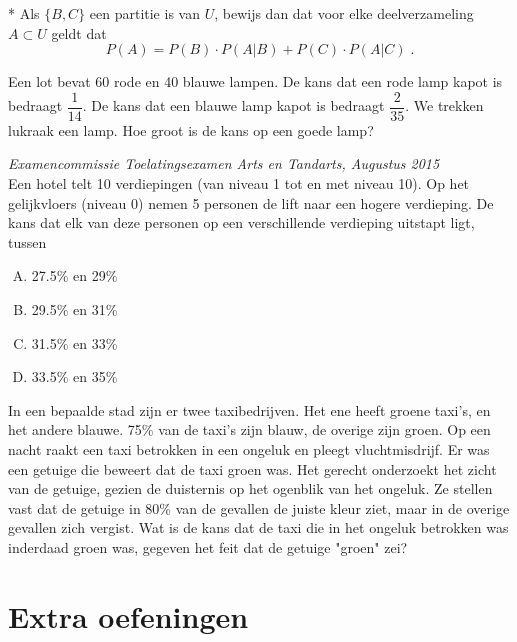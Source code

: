 \documentclass[12pt,twoside]{article}
\begin{document}
\begin{oefening}*
Als $\{B,C\}$ een partitie is van $U$, bewijs dan dat voor elke deelverzameling $A\subset U$ geldt dat
$$P(A)=P(B)\cdot P(A|B)+P(C)\cdot P(A|C)\;.$$
\end{oefening}

\begin{oefening}
Een lot bevat 60 rode en 40 blauwe lampen. De kans dat een rode lamp kapot is bedraagt $\dfrac{1}{14}$. De kans dat een blauwe lamp kapot is bedraagt $\dfrac{2}{35}$. We trekken lukraak een lamp. Hoe groot is de kans op een goede lamp?
\end{oefening}

\begin{oefening}
{\scriptsize\em Examencommissie Toelatingsexamen Arts en Tandarts, Augustus 2015}\\
Een hotel telt 10 verdiepingen (van niveau 1 tot en met niveau 10). Op het gelijkvloers
(niveau 0) nemen 5 personen de lift naar een hogere verdieping. De kans dat elk van deze
personen op een verschillende verdieping uitstapt ligt, tussen
\begin{enumerate}[(A)]
  \item 27.5\% en 29\%
  \item 29.5\% en 31\%   %
  \item 31.5\% en 33\%
  \item 33.5\% en 35\%
\end{enumerate}
\end{oefening}

\begin{oefening}
In een bepaalde stad zijn er twee taxibedrijven. Het ene heeft groene taxi's, en het andere blauwe. 75\% van de taxi's zijn blauw, de overige zijn groen. Op een nacht raakt een taxi betrokken in een ongeluk en pleegt vluchtmisdrijf. Er was een getuige die beweert dat de taxi groen was. Het gerecht onderzoekt het zicht van de getuige, gezien de duisternis op het ogenblik van het ongeluk. Ze stellen vast dat de getuige in 80\% van de gevallen de juiste kleur ziet, maar in de overige gevallen zich vergist. Wat is de kans dat de taxi die in het ongeluk betrokken was inderdaad groen was, gegeven het feit dat de getuige "groen" zei?
\end{oefening}

\pagebreak

\section{Extra oefeningen}
\end{document}
